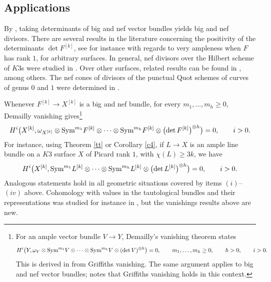 \documentclass[10pt,a4paper]{amsart}
\numberwithin{equation}{section}
\newcommand{\sym}{\textnormal{Sym}}
\begin{document}
\subsection{Applications} By \cite[Proposition 1.4]{Y}, taking determinants of big and nef vector bundles yields big and nef divisors. There are several results in the literature concerning the positivity of the determinants $\det F^{[k]}$, see for instance \cite{BS, CG} with regards to very ampleness when $F$ has rank $1$, for arbitrary surfaces. In general, nef divisors over the Hilbert scheme of $K3$s were studied in \cite[Section~10]{BM}. Over other surfaces, related results can be found in \cite{ABCH, BC, BHL+, Ko, LQZ, MM, N, QT, YY}, among others. The nef cones of divisors of the punctual Quot schemes of curves of genus $0$ and $1$ were determined in \cite{GS, St}.

Whenever $F^{[k]}\to X^{[k]}$ is a big and nef bundle, for every $m_1, \dots, m_h\geq 0$, Demailly vanishing gives\footnote{For an ample vector bundle $V\to Y$, Demailly's vanishing theorem \cite{De} states
\begin{gather*}
H^i\big(Y, \omega_Y\otimes \sym^{m_1}V\otimes \dots \otimes \sym^{m_h}V\otimes (\det V)^{\otimes h}\big)=0, \qquad m_1, \dots, m_h\geq 0, \qquad h>0, \qquad i> 0.
\end{gather*}
This is derived in \cite[Theorem 7.3.14]{L-II} from Griffiths vanishing. The same argument applies to big and nef vector bundles; \cite[Example 7.3.3]{L-II} notes that Griffiths vanishing holds in this context.}
\begin{gather*}
H^i\bigl(X^{[k]}, \omega_{X^{[k]}} \otimes \sym^{m_1}F^{[k]}\otimes \dots \otimes \sym^{m_h} F^{[k]}\otimes \bigl(\det F^{[k]}\bigr)^{\otimes h}\bigr)=0, \qquad i>0.
\end{gather*}
For instance, using Theorem \ref{tt} or Corollary \ref{c4}, if $L\to X$ is an ample line bundle on a $K3$ surface $X$ of Picard rank $1$, with $\chi(L)\geq 3k$, we have
\begin{gather*}
H^i\bigl(X^{[k]}, \sym^{m_1}L^{[k]}\otimes \dots \otimes \sym^{m_h} L^{[k]}\otimes \bigl(\det L^{[k]}\bigr)^{\otimes h}\bigr)=0, \qquad i>0.
\end{gather*}
Analogous statements hold in all geometric situations covered by items $(i)$--$(iv)$ above. Cohomology with values in the tautological bundles and their representations was studied for instance in \cite{A, Da, EGL, Sc, Z}, but the vanishings results above are new.
\end{document}
